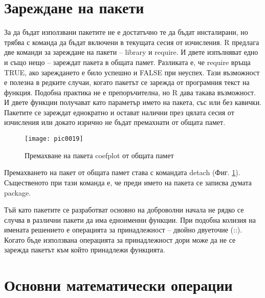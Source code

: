 \section{Зареждане на пакети}

За да бъдат използвани пакетите не е достатъчно те да бъдат инсталирани, но трябва с команда да бъдат включени в текущата сесия от изчисления. R предлага две команди за зареждане на пакети – library и require. И двете изпълняват едно и също нещо – зареждат пакета в общата памет. Разликата е, че require връща TRUE, ако зареждането е било успешно и FALSE при неуспех. Тази възможност е полезна в редките случаи, когато пакетът се зарежда от програмния текст на функция. Подобна практика не е препоръчителна, но R дава такава възможност. И двете функции получават като параметър името на пакета, със или без кавички. Пакетите се зареждат еднократно и остават налични през цялата сесия от изчисления или докато изрично не бъдат премахнати от общата памет. 

\begin{figure}[h!]
  \centering
  \texttt{[image: pic0019]}
  \caption{Премахване на пакета coefplot от общата памет}
\label{fig:pic0019}
\end{figure}
\FloatBarrier

Премахването на пакет от общата памет става с командата detach (Фиг. \ref{fig:pic0019}). Същественото при тази команда е, че преди името на пакета се записва думата package. 

Тъй като пакетите се разработват основно на доброволни начала не рядко се случва в различни пакети да има едноименни функции. При подобна колизия на имената решението е операцията за принадлежност – двойно двуеточие (::). Когато бъде използвана операцията за принадлежност дори може да не се зарежда пакетът към който принадлежи функцията. 

\section{Основни математически операции}

